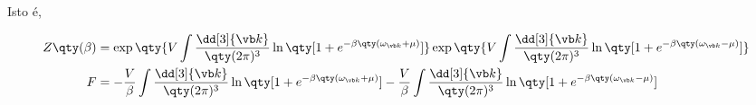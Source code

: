 \documentclass[twoside]{amsart}
\numberwithin{equation}{section}
\begin{document}
\begin{refsection}
Isto é,

\begin{align}
    Z\qty(\beta)&=\exp\qty{V\int\frac{\dd[3]{\vb k}}{\qty(2\pi)^3}\ln\qty[1+e^{-\beta\qty(\omega_{\vb k}+\mu)}]}\exp\qty{V\int\frac{\dd[3]{\vb k}}{\qty(2\pi)^3}\ln\qty[1+e^{-\beta\qty(\omega_{\vb k}-\mu)}]}\\
    F&=-\frac V\beta\int\frac{\dd[3]{\vb k}}{\qty(2\pi)^3}\ln\qty[1+e^{-\beta\qty(\omega_{\vb k}+\mu)}]-\frac V\beta\int\frac{\dd[3]{\vb k}}{\qty(2\pi)^3}\ln\qty[1+e^{-\beta\qty(\omega_{\vb k}-\mu)}]
\end{align}

\printbibliography[heading=subbibliography]
\end{refsection}

\end{document}
